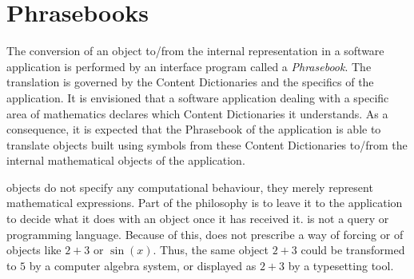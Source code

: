 \section{Phrasebooks}\label{sec_phrasebooks}

The conversion of an \OM object to/from the internal representation in a software
application is performed by an interface program called a \emph{Phrasebook}. The
translation is governed by the Content Dictionaries and the specifics of the
application. It is envisioned that a software application dealing with a specific area of
mathematics declares which Content Dictionaries it understands. As a consequence, it is
expected that the Phrasebook of the application is able to translate \OM objects built
using symbols from these Content Dictionaries to/from the internal mathematical objects of
the application.

\OM objects do not specify any computational behaviour, they merely represent mathematical
expressions.  Part of the \OM philosophy is to leave it to the application to decide what
it does with an object once it has received it.  \OM is not a query or programming
language. Because of this, \OM does not prescribe a way of forcing 
or  of objects like $2+3$ or $\sin(x)$. Thus, the same object
$2+3$ could be transformed to $5$ by a computer algebra system, or displayed as $2+3$ by a
typesetting tool.

